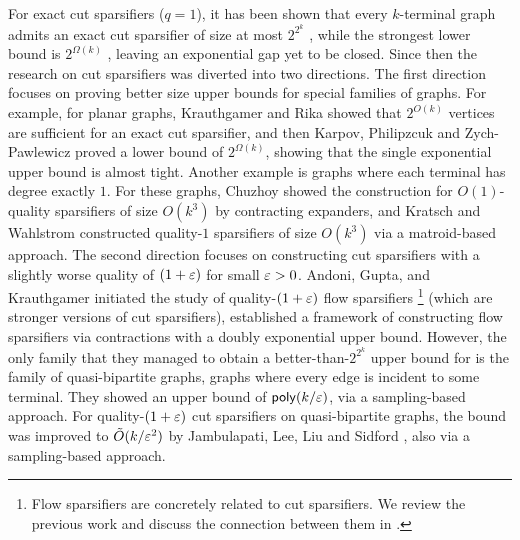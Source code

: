For exact cut sparsifiers ($q=1$), it has been shown that every $k$-terminal graph admits an exact cut sparsifier of size at most $2^{2^k}$ \cite{hagerup1998characterizing,khan2014mimicking}, while the strongest lower bound is $2^{\Omega(k)}$ \cite{khan2014mimicking,karpov2017exponential}, leaving an exponential gap yet to be closed.
Since then the research on cut sparsifiers was diverted into two directions.
The first direction focuses on proving better size upper bounds for special families of graphs.
For example, for planar graphs, Krauthgamer and Rika \cite{krauthgamer2013mimicking,krauthgamer2017refined} showed that $2^{O(k)}$ vertices are sufficient for an exact cut sparsifier, and then Karpov, Philipzcuk and Zych-Pawlewicz \cite{karpov2017exponential} proved a lower bound of $2^{\Omega(k)}$, showing that the single exponential upper bound is almost tight.
Another example is graphs where each terminal has degree exactly $1$. For these graphs, Chuzhoy \cite{chuzhoy2012vertex} showed the construction for $O(1)$-quality sparsifiers of size $O(k^3)$ by contracting expanders, and Kratsch and Wahlstrom \cite{kratsch2012representative} constructed quality-$1$ sparsifiers of size $O(k^3)$ via a matroid-based approach.
%
The second direction focuses on constructing cut sparsifiers with a slightly worse quality of $(1+{\varepsilon})$ for small ${\varepsilon}>0$.
Andoni, Gupta, and Krauthgamer \cite{andoni2014towards} initiated the study of quality-$(1+{\varepsilon})$ flow sparsifiers \footnote{Flow sparsifiers are concretely related to cut sparsifiers. We review the previous work and discuss the connection between them in .} (which are stronger versions of cut sparsifiers), established a framework of constructing flow sparsifiers via contractions with a doubly exponential upper bound. However, the only family that they managed to obtain a better-than-$2^{2^k}$ upper bound for is the family of quasi-bipartite graphs, graphs where every edge is incident to some terminal. They showed an upper bound of $\mathsf{poly}(k/{\varepsilon})$, via a sampling-based approach.
%
For quality-$(1+{\varepsilon})$ cut sparsifiers on quasi-bipartite graphs, the bound was improved to $\tilde O(k/{\varepsilon}^2)$ by Jambulapati, Lee, Liu and Sidford \cite{jambulapati2023sparsifying}, also via a sampling-based approach.

